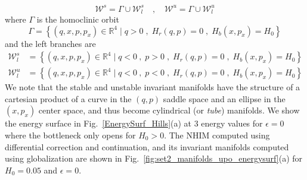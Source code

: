 \documentclass{ws-ijbc}
\begin{document}
\begin{equation}
\mathcal{W}^s = \Gamma \cup \mathcal{W}^s_l \quad , \quad \mathcal{W}^u = \Gamma \cup \mathcal{W}^u_l 
\end{equation}
where $\Gamma$ is the homoclinic orbit
\begin{equation}
\Gamma = \left\lbrace  (q,x,p,p_x) \in \mathbb{R}^4 \; | \; q > 0 \;,\; H_r(q,p) = 0 \;,\; H_b(x,p_x) = H_0  \right\rbrace
\end{equation}
and the left branches are
\begin{equation}
\begin{split}
\mathcal{W}^s_l &= \left\lbrace  (q,x,p,p_x) \in \mathbb{R}^4 \; | \; q < 0 \:,\; p > 0 \;,\; H_r(q,p) = 0 \;,\; H_b(x,p_x) = H_0 \right\rbrace \\[.2cm]
\mathcal{W}^u_l &= \left\lbrace  (q,x,p,p_x) \in \mathbb{R}^4 \; | \; q < 0 \:,\; p < 0 \;,\; H_r(q,p) = 0 \;,\; H_b(x,p_x) = H_0 \right\rbrace
\end{split}
\end{equation}
We note that the stable and unstable invariant manifolds have the structure of a cartesian product of a curve in the $(q,p)$ saddle space and an ellipse in the $(x,p_x)$ center space, and thus become cylindrical (or \textit{tube}) manifolds. We show the energy surface in Fig.~\ref{EnergySurf_Hills}(a) at 3 energy values for $\epsilon = 0$ where the bottleneck only opens for $H_0 > 0$. The NHIM computed using differential correction and continuation, and its invariant manifolds computed using globalization are shown in Fig.~\ref{fig:set2_manifolds_upo_energysurf}(a) for $H_0 = 0.05$ and $\epsilon = 0$. 
\end{document}
